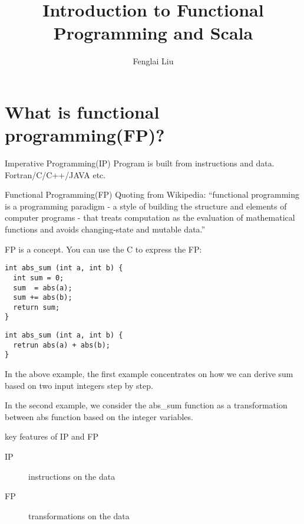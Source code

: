 \documentclass[notheorems, aspectratio=54]{beamer}
\title[Introduction to Functional Programming and Scala]{Introduction to Functional Programming and Scala}
\author{Fenglai Liu}
\institute[ACCRE]{fenglai@accre.vanderbilt.edu}
\begin{document}
\begin{frame}
    \titlepage
\end{frame}


\section{What is functional programming(FP)?}
\begin{frame}

\begin{block}{Imperative Programming(IP)}
Program is built from instructions and data. Fortran/C/C++/JAVA etc.
\end{block}

\begin{block}{Functional Programming(FP)}
Quoting from Wikipedia: ``functional programming is a programming 
paradigm - a style of building the structure and elements of computer 
programs - that treats computation as the evaluation of mathematical 
functions and avoids changing-state and mutable data.''
\end{block}

\end{frame}

\begin{frame}[fragile]

FP is a concept. You can use the C to express the FP:

\begin{verbatim}
int abs_sum (int a, int b) {
  int sum = 0;
  sum  = abs(a);
  sum += abs(b);
  return sum;
}
\end{verbatim}

\begin{verbatim}
int abs_sum (int a, int b) {
  retrun abs(a) + abs(b);
}
\end{verbatim}

In the above example, the first example concentrates on how we can derive sum based 
on two input integers step by step. 

In the second example, we consider the abs\_sum function as a transformation between 
abs function based on the integer variables. 

\begin{block}{key features of IP and FP}
 \begin{description}
 \item [IP] instructions on the data
 \item [FP] transformations on the data
\end{description}
\end{block}

\end{frame}
\end{document}
